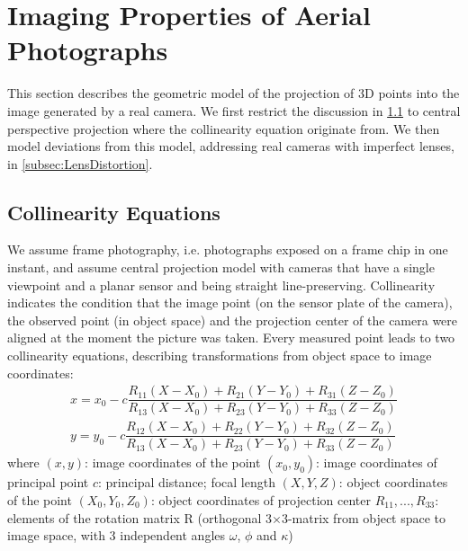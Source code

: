 \section{Imaging Properties of Aerial Photographs}
\label{sec:Geometry}

This section describes the geometric model of the projection of 3D points into the image generated by a real camera. We first restrict the discussion in \cref{subsec:Collinearity} to central perspective projection where the collinearity equation originate from. We then model deviations from this model, addressing real cameras with imperfect lenses, in \cref{subsec:LensDistortion}.

\subsection{Collinearity Equations}
\label{subsec:Collinearity}
We assume frame photography, i.e. photographs exposed on a frame chip in one instant, and assume central projection model with cameras that have a single viewpoint and a planar sensor and being straight line-preserving. Collinearity indicates the condition that the image point (on the sensor plate of the camera), the observed point (in object space) and the projection center of the camera were aligned at the moment the picture was taken. Every measured point leads to two collinearity equations, describing transformations from object space to image coordinates:
\begin{equation} \label{eq:collinearity}
\begin{split}
x = x_0 -c \dfrac {R_{11}(X-X_0) + R_{21}(Y-Y_0) + R_{31}(Z-Z_0)} {R_{13}(X-X_0) + R_{23}(Y-Y_0) + R_{33}(Z-Z_0)} \\
y = y_0 -c \dfrac {R_{12}(X-X_0) + R_{22}(Y-Y_0) + R_{32}(Z-Z_0)} {R_{13}(X-X_0) + R_{23}(Y-Y_0) + R_{33}(Z-Z_0)}
\end{split}
\end{equation}
where\newline
$(x, y)$: image coordinates of the point \newline
$(x_0, y_0)$: image coordinates of principal point \newline
$c$: principal distance; focal length \newline
$(X, Y, Z)$: object coordinates of the point \newline
$(X_0, Y_0, Z_0)$: object coordinates of projection center \newline
$R_{11},...,R_{33}$: elements of the rotation matrix R (orthogonal 3$\times$3-matrix from object space to image space, with 3 independent angles $\omega$, $\phi$ and $\kappa$)


